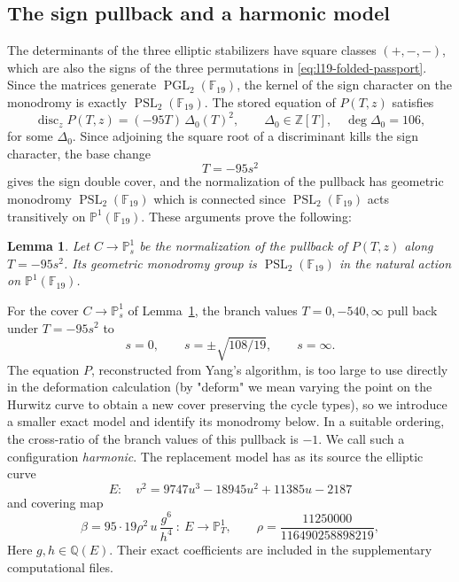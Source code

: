 \documentclass[10pt]{amsart}
\numberwithin{equation}{section}
\newcommand{\Disc}{\operatorname{disc}}
\newtheorem{lemma}[theorem]{Lemma}
\theoremstyle{definition}
\theoremstyle{remark}
\newcommand{\PP}{\mathbb P}
\newcommand{\F}{\mathbb{F}}
\newcommand{\Q}{\mathbb{Q}}
\newcommand{\Z}{\mathbb{Z}}
\newcommand{\PGL}{\operatorname{PGL}}
\newcommand{\PSL}{\operatorname{PSL}}
\begin{document}
\subsection{The sign pullback and a harmonic model}\label{subsec:l19-sign}
The determinants of the three elliptic stabilizers have square classes
$(+,-,-)$, which are also the signs of the three permutations in
\eqref{eq:l19-folded-passport}.  Since the matrices generate
$\PGL_2(\F_{19})$, the kernel of the sign character on the monodromy is
exactly $\PSL_2(\F_{19})$.  The stored equation of $P(T,z)$ satisfies 
\[
 \Disc_z P(T,z)=(-95T)\,\Delta_0(T)^2,
 \qquad\Delta_0\in\Z[T],\quad\deg\Delta_0=106 ,
\]
for some $\Delta_0$. Since adjoining the square root of a discriminant kills the sign character, the base change
\begin{equation}\label{eq:l19-sign-basechange}
 T=-95s^2
\end{equation}
gives the sign double cover, and the normalization of the pullback has
geometric monodromy $\PSL_2(\F_{19})$ which is connected since $\PSL_2(\F_{19})$ acts transitively on $\PP^1(\F_{19})$. These arguments prove the following:

\begin{lemma}\label{lem:l19-sign-pullback}
Let $C\to\PP^1_s$ be the normalization of the pullback of $P(T,z)$ along
$T=-95s^2$.  Its geometric monodromy group is $\PSL_2(\F_{19})$ in the
natural action on $\PP^1(\F_{19})$.
\end{lemma}


 For the cover $C\to\PP^1_s$ of Lemma~\ref{lem:l19-sign-pullback}, the branch
  values $T=0,-540,\infty$ pull back under $T=-95s^2$ to
  \[
   s=0,\qquad s=\pm\sqrt{108/19},\qquad s=\infty.
  \]
The equation $P$, reconstructed from Yang's algorithm, is too large to use directly in the deformation calculation (by "deform" we mean varying the point on the Hurwitz curve to obtain a new cover preserving the cycle types), so we introduce a smaller exact model and identify its monodromy below. In a suitable ordering, the cross-ratio of the branch values of this pullback is
$-1$.  We call such a configuration \emph{harmonic}. The replacement model has as its source the
elliptic curve
\begin{equation}\label{eq:l19-harmonic-elliptic}
 E:\quad v^2=9747u^3-18945u^2+11385u-2187
\end{equation}
and covering map
\begin{equation}\label{eq:l19-harmonic-map}
 \beta=95\cdot19\rho^2\,u\,\frac{g^6}{h^4}\ \colon\ E\longrightarrow\PP^1_T,
 \qquad
 \rho=\frac{11250000}{116490258898219},
\end{equation}
Here $g,h\in\Q(E)$. Their exact coefficients are included in the supplementary computational files.
\end{document}
